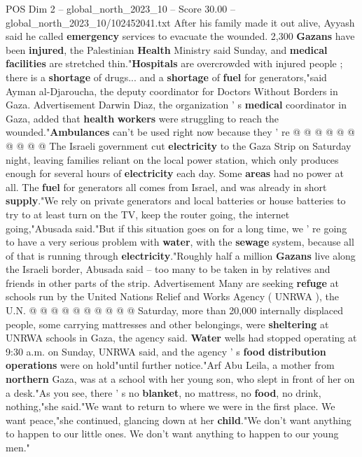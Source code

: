 \begin{textsample}{POS Dim 2 – global\_north\_2023\_10 – Score 30.00 – global\_north\_2023\_10/102452041.txt}
After his family made it out alive, Ayyash said he called \textbf{emergency} services to evacuate the wounded. 2,300 \textbf{Gazans} have been \textbf{injured}, the Palestinian \textbf{Health} Ministry said Sunday, and \textbf{medical} \textbf{facilities} are stretched thin."\textbf{Hospitals} are overcrowded with injured people ; there is a \textbf{shortage} of drugs... and a \textbf{shortage} of \textbf{fuel} for generators,"said Ayman al-Djaroucha, the deputy coordinator for Doctors Without Borders in Gaza.
Advertisement Darwin Diaz, the organization ' s \textbf{medical} coordinator in Gaza, added that \textbf{health} \textbf{workers} were struggling to reach the wounded."\textbf{Ambulances} can't be used right now because they ' re @ @ @ @ @ @ @ @ @ @ The Israeli government cut \textbf{electricity} to the Gaza Strip on Saturday night, leaving families reliant on the local power station, which only produces enough for several hours of \textbf{electricity} each day.
Some \textbf{areas} had no power at all.
The \textbf{fuel} for generators all comes from Israel, and was already in short \textbf{supply}."We rely on private generators and local batteries or house batteries to try to at least turn on the TV, keep the router going, the internet going,"Abusada said."But if this situation goes on for a long time, we ' re going to have a very serious problem with \textbf{water}, with the \textbf{sewage} system, because all of that is running through \textbf{electricity}."Roughly half a million \textbf{Gazans} live along the Israeli border, Abusada said -- too many to be taken in by relatives and friends in other parts of the strip.
Advertisement Many are seeking \textbf{refuge} at schools run by the United Nations Relief and Works Agency ( UNRWA ), the U.N. @ @ @ @ @ @ @ @ @ @ Saturday, more than 20,000 internally displaced people, some carrying mattresses and other belongings, were \textbf{sheltering} at UNRWA schools in Gaza, the agency said. \textbf{Water} wells had stopped operating at 9:30 a.m. on Sunday, UNRWA said, and the agency ' s \textbf{food} \textbf{distribution} \textbf{operations} were on hold"until further notice."Arf Abu Leila, a mother from \textbf{northern} Gaza, was at a school with her young son, who slept in front of her on a desk."As you see, there ' s no \textbf{blanket}, no mattress, no \textbf{food}, no drink, nothing,"she said."We want to return to where we were in the first place.
We want peace,"she continued, glancing down at her \textbf{child}."We don't want anything to happen to our little ones.
We don't want anything to happen to our young men."

\end{textsample}
